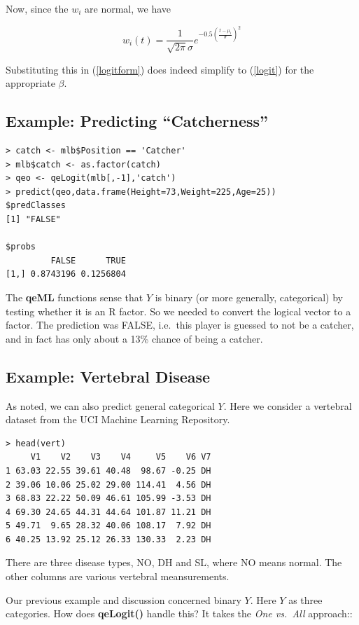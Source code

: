 Now, since the $w_i$ are normal, we have

\begin{equation}
w_i(t) = 
\frac{1}{\sqrt{2 \pi} \sigma}
e^{-0.5 \left ( \frac{t-\mu_i}{\sigma} \right )^2}
\end{equation}

Substituting this in (\ref{logitform}) does indeed simplify to
(\ref{logit}) for the appropriate $\beta$.

\subsection{Example:  Predicting ``Catcherness''}

\begin{lstlisting}
> catch <- mlb$Position == 'Catcher'
> mlb$catch <- as.factor(catch)
> qeo <- qeLogit(mlb[,-1],'catch')
> predict(qeo,data.frame(Height=73,Weight=225,Age=25))
$predClasses
[1] "FALSE"

$probs
         FALSE      TRUE
[1,] 0.8743196 0.1256804
\end{lstlisting}

The \textbf{qeML} functions sense that $Y$ is binary (or more generally,
categorical) by testing whether it is an R factor.  So we needed to
convert the logical vector to a factor.  The prediction was FALSE, i.e.\
this player is guessed to not be a catcher, and in fact has only about a
13\% chance of being a catcher.

\subsection{Example:  Vertebral Disease}

As noted, we can also predict general categorical $Y$.  Here we
consider a vertebral dataset from the UCI Machine Learning Repository.

\begin{lstlisting}
> head(vert)
     V1    V2    V3    V4     V5    V6 V7
1 63.03 22.55 39.61 40.48  98.67 -0.25 DH
2 39.06 10.06 25.02 29.00 114.41  4.56 DH
3 68.83 22.22 50.09 46.61 105.99 -3.53 DH
4 69.30 24.65 44.31 44.64 101.87 11.21 DH
5 49.71  9.65 28.32 40.06 108.17  7.92 DH
6 40.25 13.92 25.12 26.33 130.33  2.23 DH
\end{lstlisting}

There are three disease types, NO, DH and SL, where NO means normal.
The other columns are various vertebral meansurements.

Our previous example and discussion concerned binary $Y$.  Here $Y$
as three categories.  How does \textbf{qeLogit()} handle this?  It takes
the \textit{One vs.\ All} approach::

